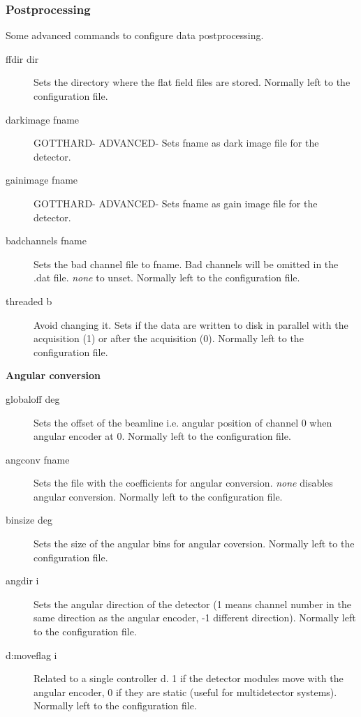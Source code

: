 \documentclass{article}
\begin{document}
\subsubsection{Postprocessing}
Some advanced commands to configure data postprocessing.
\begin{description}      
\item[ffdir dir] Sets the directory where the flat field files are stored. Normally left to the configuration file.
\item[darkimage fname] GOTTHARD- ADVANCED- Sets fname as dark image file for the detector.       
\item[gainimage fname] GOTTHARD- ADVANCED- Sets fname as gain image file for the detector. 
\item[badchannels fname] Sets the bad channel file to fname. Bad channels will be omitted in the .dat file.  \textit{none} to unset.  Normally left to the configuration file.   
\item[threaded b] Avoid changing it. Sets if the data are written to disk in parallel with the acquisition (1) or after the acquisition (0).    Normally left to the configuration file.      
\end{description}


\textbf{Angular conversion}

\begin{description}
\item[globaloff deg]   Sets the  offset  of the beamline i.e. angular position of channel 0 when angular encoder at 0. Normally left to the configuration file.
\item[angconv fname]  Sets the file with the coefficients for angular conversion. \textit{none} disables angular conversion.   Normally left to the configuration file. 
\item[binsize deg] Sets the size of the angular bins for angular coversion.  Normally left to the configuration file. 
\item[angdir i] Sets the angular direction of the detector (1 means channel number in the same direction as the angular encoder, -1 different direction).  Normally left to the configuration file.
\item[d:moveflag i]  Related to a single controller d. 1 if the detector modules move with the angular encoder, 0 if they are static (useful for multidetector systems). Normally left to the configuration file.
\end{description}
\end{document}
